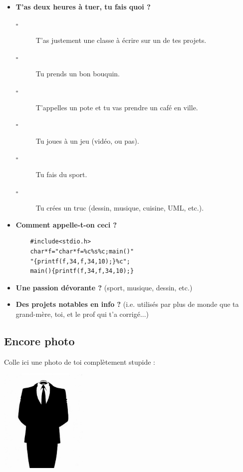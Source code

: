 \begin{itemize}
    \item \textbf{T'as deux heures à tuer, tu fais quoi ?}
    \begin{description}
	\item[$\square$] T'as justement une classe à écrire sur un de tes projets.
	\item[$\square$] Tu prends un bon bouquin.
	\item[$\square$] T'appelles un pote et tu vas prendre un café en ville.
	\item[$\square$] Tu joues à un jeu (vidéo, ou pas).
	\item[$\square$] Tu fais du sport.
	\item[$\square$] Tu crées un truc (dessin, musique, cuisine, UML, etc.).
    \end{description}
	\vspace{1cm}
	
    \item \textbf{Comment appelle-t-on ceci ?}
    \begin{verbatim}
	#include<stdio.h>
	char*f="char*f=%c%s%c;main()"
	"{printf(f,34,f,34,10);}%c";
	main(){printf(f,34,f,34,10);}
    \end{verbatim}
    \vspace{1cm}
	
    \item \textbf{Une passion dévorante ?} (sport, musique, dessin, etc.)
    \vspace{4cm}
	
    \item \textbf{Des projets notables en info ?} (i.e. utilisés par plus de monde que ta
	    grand-mère, toi, et le prof qui t'a corrigé...)
    \vspace{5cm}
\end{itemize}
\subsection*{Encore photo}
Colle ici une photo de toi complètement stupide :
\begin{center}
\includegraphics[height=5cm, angle=120]{images/anonymous.jpg}
\end{center}

